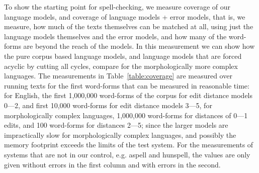 \documentclass[a4paper,12pt]{article}
\begin{document}
To show the starting point for spell-checking, we measure coverage of our
language models, and coverage of language models + error models, that is, we
measure, how much of the texts themselves can be matched at all, using just the
language models themselves and the error models, and how many of the word-forms
are beyond the reach of the models. In this measurement we can show how the
pure corpus based language models, and language models that are forced acyclic
by cutting all cycles, compare for the morphologically more complex languages.
The measurements in Table~\ref{table:coverage} are measured over running texts
for the first word-forms that can be measured in reasonable time: for English,
the first 1,000,000 word-forms of the corpus for edit distance models 0---2,
and first 10,000 word-forms for edit distance models 3---5, for morphologically
complex languages, 1,000,000 word-forms for distances of 0---1 edits, and 100
word-forms for distances 2---5; since the larger models are impractically slow
for morphologically complex languages, and possibly the memory footprint
exceeds the limits of the test system. For the measurements of systems that are
not in our control, e.g. aspell and hunspell, the values are only given
without errors in the first column and with errors in the second.
\end{document}
